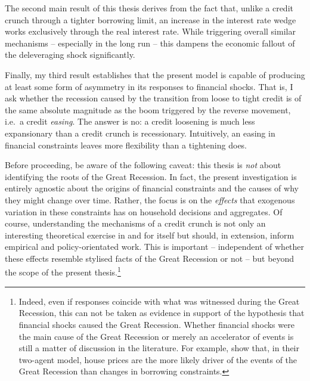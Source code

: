 \documentclass[a4paper,12pt]{article} %
\numberwithin{equation}{section} %
\numberwithin{figure}{section}
\numberwithin{table}{section}
\begin{document}
The second main result of this thesis derives from the fact that, unlike a credit crunch through a tighter borrowing limit, an increase in the interest rate wedge works exclusively through the real interest rate. While triggering overall similar mechanisms -- especially in the long run -- this dampens the economic fallout of the deleveraging shock significantly.

Finally, my third result establishes that the present model is capable of producing at least some form of asymmetry in its responses to financial shocks. That is, I ask whether the recession caused by the transition from loose to tight credit is of the same absolute magnitude as the boom triggered by the reverse movement, i.e.~a credit \textit{easing}. The answer is no: a credit loosening is much less expansionary than a credit crunch is recessionary. Intuitively, an easing in financial constraints leaves more flexibility than a tightening does.

Before proceeding, be aware of the following caveat: this thesis is \textit{not} about identifying the roots of the Great Recession. In fact, the present investigation is entirely agnostic about the origins of financial constraints and the causes of why they might change over time. Rather, the focus is on the \textit{effects} that exogenous variation in these constraints has on household decisions and aggregates. Of course, understanding the mechanisms of a credit crunch is not only an interesting theoretical exercise in and for itself but should, in extension, inform empirical and policy-orientated work. This is important -- independent of whether these effects resemble stylised facts of the Great Recession or not -- but beyond the scope of the present thesis.\footnote{Indeed, even if responses coincide with what was witnessed during the Great Recession, this can not be taken as evidence in support of the hypothesis that financial shocks caused the Great Recession. Whether financial shocks were the main cause of the Great Recession or merely an accelerator of events is still a matter of discussion in the literature. For example, \textcite{justiniano2015} show that, in their two-agent model, house prices are the more likely driver of the events of the Great Recession than changes in borrowing constraints.}

\end{document}
